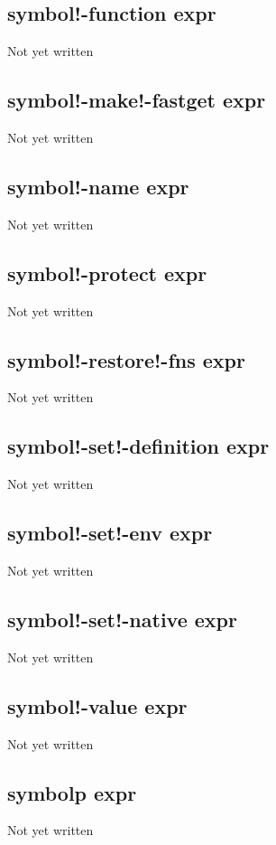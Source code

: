 \documentclass[a4paper,11pt]{article}
\begin{document}
\subsection{\ttfamily symbol!-function expr}
Not yet written

\subsection{\ttfamily symbol!-make!-fastget expr}
Not yet written

\subsection{\ttfamily symbol!-name expr}
Not yet written

\subsection{\ttfamily symbol!-protect expr}
Not yet written

\subsection{\ttfamily symbol!-restore!-fns expr}
Not yet written

\subsection{\ttfamily symbol!-set!-definition expr}
Not yet written

\subsection{\ttfamily symbol!-set!-env expr}
Not yet written

\subsection{\ttfamily symbol!-set!-native expr}
Not yet written

\subsection{\ttfamily symbol!-value expr}
Not yet written

\subsection{\ttfamily symbolp expr}
Not yet written
\end{document}
